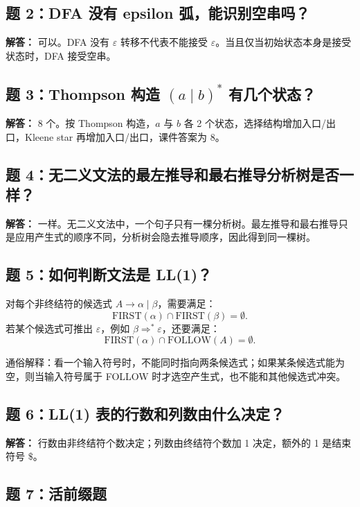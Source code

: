 \documentclass[UTF8,fontset=none,11pt]{ctexart}
\newcommand{\eps}{\varepsilon}
\newcommand{\FIRST}{\ensuremath{\mathrm{FIRST}}}
\newcommand{\FOLLOW}{\ensuremath{\mathrm{FOLLOW}}}
\begin{document}
\subsection*{题 2：DFA 没有 epsilon 弧，能识别空串吗？}

\textbf{解答：} 可以。DFA 没有 \(\eps\) 转移不代表不能接受 \(\eps\)。当且仅当初始状态本身是接受状态时，DFA 接受空串。

\subsection*{题 3：Thompson 构造 \texorpdfstring{\((a\mid b)^*\)}{(a|b)*} 有几个状态？}

\textbf{解答：} 8 个。按 Thompson 构造，\(a\) 与 \(b\) 各 2 个状态，选择结构增加入口/出口，Kleene star 再增加入口/出口，课件答案为 8。

\subsection*{题 4：无二义文法的最左推导和最右推导分析树是否一样？}

\textbf{解答：} 一样。无二义文法中，一个句子只有一棵分析树。最左推导和最右推导只是应用产生式的顺序不同，分析树会隐去推导顺序，因此得到同一棵树。

\subsection*{题 5：如何判断文法是 LL(1)？}

对每个非终结符的候选式 \(A\to\alpha\mid\beta\)，需要满足：
\[
\FIRST(\alpha)\cap\FIRST(\beta)=\emptyset.
\]
若某个候选式可推出 \(\eps\)，例如 \(\beta\Rightarrow^*\eps\)，还要满足：
\[
\FIRST(\alpha)\cap\FOLLOW(A)=\emptyset.
\]

通俗解释：看一个输入符号时，不能同时指向两条候选式；如果某条候选式能为空，则当输入符号属于 FOLLOW 时才选空产生式，也不能和其他候选式冲突。

\subsection*{题 6：LL(1) 表的行数和列数由什么决定？}

\textbf{解答：} 行数由非终结符个数决定；列数由终结符个数加 1 决定，额外的 1 是结束符号 \(\$\)。

\subsection*{题 7：活前缀题}
\end{document}
